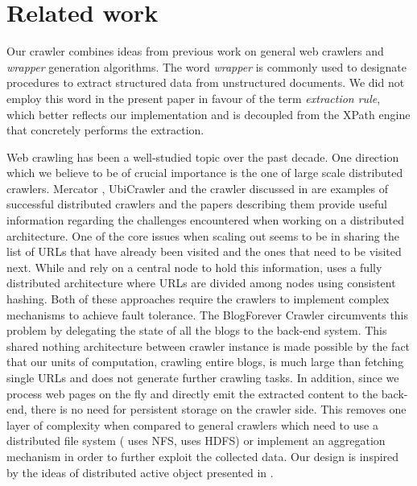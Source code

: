 \section{Related work}
\label{relatedwork}

Our crawler combines ideas from previous work on general web crawlers and \emph{wrapper} generation algorithms. The word \emph{wrapper} is commonly used to designate procedures to extract structured data from unstructured documents. We did not employ this word in the present paper in favour of the term \emph{extraction rule}, which better reflects our implementation and is decoupled from the XPath engine that concretely performs the extraction.

Web crawling has been a well-studied topic over the past decade. One direction which we believe to be of crucial importance is the one of large scale distributed crawlers. Mercator \cite{heydon99mercator}, UbiCrawler \cite{boldi2003} and the crawler discussed in \cite{shkapenyuk2002} are examples of successful distributed crawlers and the papers describing them provide useful information regarding the challenges encountered when working on a distributed architecture. One of the core issues when scaling out seems to be in sharing the list of URLs that have already been visited and the ones that need to be visited next. While \cite{heydon99mercator} and \cite{shkapenyuk2002} rely on a central node to hold this information, \cite{boldi2003} uses a fully distributed architecture where URLs are divided among nodes using consistent hashing. Both of these approaches require the crawlers to implement complex mechanisms to achieve fault tolerance.
%
The BlogForever Crawler circumvents this problem by delegating the state of all the blogs to the back-end system. This shared nothing architecture between crawler instance is made possible by the fact that our units of computation, crawling entire blogs, is much large than fetching single URLs and does not generate further crawling tasks.
%
In addition, since we process web pages on the fly and directly emit the extracted content to the back-end, there is no need for persistent storage on the crawler side. This removes one layer of complexity when compared to general crawlers which need to use a distributed file system (\cite{shkapenyuk2002} uses NFS, \cite{berger2011} uses HDFS) or implement an aggregation mechanism in order to further exploit the collected data. Our design is inspired by the ideas of distributed active object presented in \cite{activeobject1996}.



